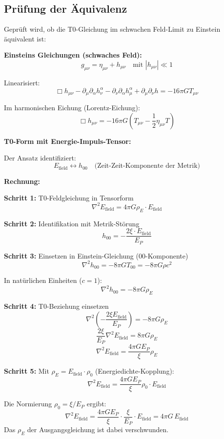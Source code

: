 	\subsection*{\textbf{Prüfung der Äquivalenz}}
	
	Geprüft wird, ob die T0-Gleichung im schwachen Feld-Limit zu Einstein äquivalent ist:
	
	\textbf{Einsteins Gleichungen (schwaches Feld):}
	\[
	g_{\mu\nu} = \eta_{\mu\nu} + h_{\mu\nu} \quad \text{mit } |h_{\mu\nu}| \ll 1
	\]
	
	Linearisiert:
	\[
	\Box h_{\mu\nu} - \partial_\mu \partial_\alpha h^\alpha_\nu - \partial_\nu \partial_\alpha h^\alpha_\mu + \partial_\mu \partial_\nu h = -16\pi G T_{\mu\nu}
	\]
	
	Im harmonischen Eichung (Lorentz-Eichung):
	\[
	\Box h_{\mu\nu} = -16\pi G \left(T_{\mu\nu} - \frac{1}{2}\eta_{\mu\nu}T\right)
	\]
	
	\textbf{T0-Form mit Energie-Impuls-Tensor:}
	
	Der Ansatz identifiziert:
	\[
	E_{\text{field}} \leftrightarrow h_{00} \quad \text{(Zeit-Zeit-Komponente der Metrik)}
	\]
	
	\textbf{Rechnung:}
	
	\textbf{Schritt 1:} T0-Feldgleichung in Tensorform
	\[
	\nabla^2 E_{\text{field}} = 4\pi G \rho_E \cdot E_{\text{field}}
	\]
	
	\textbf{Schritt 2:} Identifikation mit Metrik-Störung
	\[
	h_{00} = -\frac{2\xi \cdot E_{\text{field}}}{E_P}
	\]
	
	\textbf{Schritt 3:} Einsetzen in Einstein-Gleichung (00-Komponente)
	\[
	\nabla^2 h_{00} = -8\pi G T_{00} = -8\pi G \rho c^2
	\]
	
	In natürlichen Einheiten ($c=1$):
	\[
	\nabla^2 h_{00} = -8\pi G \rho_E
	\]
	
	\textbf{Schritt 4:} T0-Beziehung einsetzen
	\[
	\nabla^2 \left(-\frac{2\xi E_{\text{field}}}{E_P}\right) = -8\pi G \rho_E
	\]
	\[
	\frac{2\xi}{E_P} \nabla^2 E_{\text{field}} = 8\pi G \rho_E
	\]
	\[
	\nabla^2 E_{\text{field}} = \frac{4\pi G E_P}{\xi} \rho_E
	\]
	
	\textbf{Schritt 5:} Mit $\rho_E = E_{\text{field}} \cdot \rho_0$ (Energiedichte-Kopplung):
	\[
	\nabla^2 E_{\text{field}} = \frac{4\pi G E_P}{\xi} \rho_0 \cdot E_{\text{field}}
	\]
	
	Die Normierung $\rho_0 = \xi/E_P$ ergibt:
	\[
	\nabla^2 E_{\text{field}} = \frac{4\pi G E_P}{\xi}\cdot\frac{\xi}{E_P}\cdot E_{\text{field}} = 4\pi G\,E_{\text{field}}
	\]
	Das $\rho_E$ der Ausgangsgleichung ist dabei verschwunden.
	
